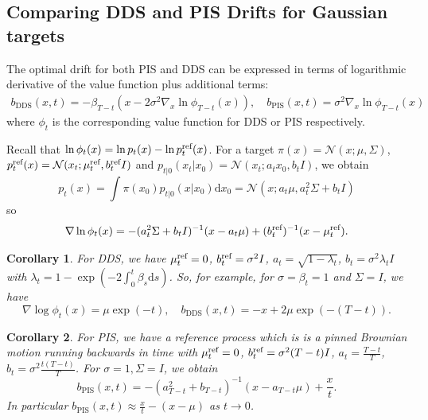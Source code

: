 \documentclass{article} %
\newtheorem{corollary}{Corollary}
\begin{document}
\subsection{Comparing DDS and PIS Drifts for Gaussian targets}\label{app:comparisonDDSPIS}
The optimal drift for both PIS and DDS can be expressed in terms of logarithmic derivative of the value function plus additional terms:
\begin{align}\label{eq:drifteq}
     b_{\mathrm{DDS}}(x,t) = -\beta_{T-t}(x-2 \sigma^2 \nabla_x \ln \phi_{T-t}(x) ),  \quad  b_{\mathrm{PIS}}(x,t) = \sigma^2 \nabla_x \ln \phi_{T-t}(x)
\end{align}
where $\phi_t$ is the corresponding value function for DDS or PIS respectively.

Recall that $\log \phi_t(x)=\log p_t(x)-\log p^{\textup{ref}}_{t}(x)$. For a target $\pi(x)=\mathcal{N}(x;\mu,\Sigma)$, $p^{\textup{ref}}_{t}(x)=\mathcal{N}(x_t;\mu^{\textup{ref}}_t,b^{\textup{ref}}_t I)$  and $p_{t|0}(x_t|x_0)=\mathcal{N}(x_t;a_t x_0,b_t I)$, we obtain  
\begin{equation*}
    p_t(x)=\int \pi(x_0) p_{t|0}(x|x_0) \mathrm{d}x_0 =\mathcal{N}(x;a_t \mu, a^2_t \Sigma+b_t I)
\end{equation*}
so 
\begin{equation}
    \nabla \log \phi_t(x)=-(a^2_t \Sigma+b_t I)^{-1}(x-a_t \mu)+(b^{\textup{ref}}_{t})^{-1}(x-\mu^{\textup{ref}}_t).
\end{equation}


\begin{corollary}\label{drift:dds}
For DDS, we have $\mu^{\textup{ref}}_t=0$, $b^{\textup{ref}}_t=\sigma^2 I$, $a_t=\sqrt{1-\lambda_t}$, $b_t=\sigma^2 \lambda_t I$ with  $\lambda_t=1-\exp(-2\int^t_0\beta_s \mathrm{d}s)$.
So, for example, for $\sigma=\beta_t=1$ and $\Sigma=I$, we have 
\begin{equation}
      \nabla \log \phi_t(x)=\mu \exp(-t),\quad  b_{\mathrm{DDS}}(x,t) = -x+2 \mu \exp(-(T-t)).
\end{equation}
\end{corollary}
\begin{corollary}\label{drift:pis}
For PIS, we have a reference process which is is a pinned Brownian motion running backwards in time with $\mu^{\textup{ref}}_t=0$, $b^{\textup{ref}}_t=\sigma^2 (T-t)I$, $a_t=\frac{T-t}{T}$, $b_t=\sigma^2 \frac{t(T-t)}{T}$. For $\sigma=1, \Sigma=I$, we obtain 
\begin{equation}
     b_{\mathrm{PIS}}(x,t)= -(a^2_{T-t}+b_{T-t})^{-1}(x-a_{T-t} \mu)+\frac{x}{t}.
\end{equation}
In particular
$b_{\mathrm{PIS}}(x,t) \approx \frac{x}{t}-(x-\mu)$ as $t \rightarrow 0$.
\end{corollary}
\end{document}
